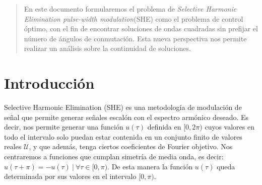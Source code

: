 
\begin{abstract}
    En este documento formularemos el problema de \emph{Selective Harmonic Elimination pulse-width modulation}(SHE) como el problema de control óptimo, con el fin de encontrar soluciones de ondas cuadradas sin prefijar el número de ángulos de conmutación. 
    Esta nueva perspectiva nos permite realizar un análisis sobre la continuidad de soluciones.
\end{abstract}
\tableofcontents


\section{Introducción} 
 

Selective Harmonic Elimination (SHE) \cite{Rodriguez2002} es una metodología de modulación de señal que permite generar señales escalón con el espectro armónico deseado. 
%
Es decir, nos permite generar una función $u(\tau)$ definida en $[0,2\pi)$ cuyos valores en todo el intervalo solo puedan estar contenida en un conjunto  finito de valores reales $\mathcal{U}$, y que además, tenga ciertos coeficientes de Fourier objetivo. 
%
Nos centraremos a funciones que cumplan simetría de media onda, es decir: $u(\tau + \pi) = -u(\tau) \ | \ \forall \tau \in [0,\pi)$. De esta manera la función $u(\tau)$ queda determinada por sus valores en el intervalo $[0,\pi)$. 
% 
%
%
\newline 



